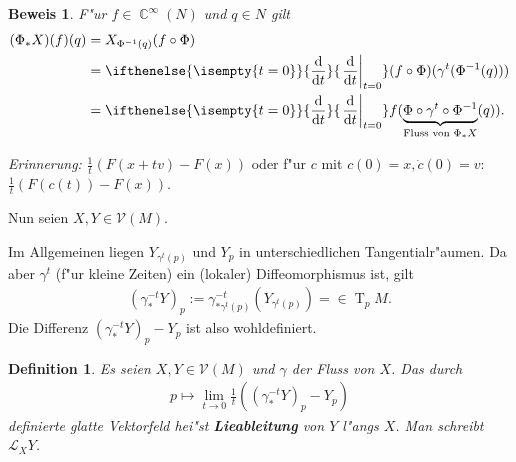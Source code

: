 \documentclass[paper=A4, twoside, chapterprefix=true, bibliography=totoc, headsepline]{scrbook}
\DeclareMathOperator{\C}{\mathbb{C}}
\DeclareMathOperator{\T}{T} %
\newcommand{\dop}{\mathrm{d}}
\newcommand{\difffrac}[3][]{\ifthenelse{\isempty{#1}}{\frac{\dop #2}{\dop #3}}{\left. \frac{\dop #2}{\dop #3} \right|_{#1}}}
\theoremstyle{plain}
\newtheorem{Dfn}{Definition}[chapter]
\newtheorem{Bem}[Dfn]{Bemerkung}
\theoremstyle{nonumberplain}
\newtheorem{bew}{Beweis}
\theoremstyle{empty}
\theoremstyle{break}
\newcommand{\CmIndex}[2][]{\ifthenelse{\isempty{#1}}{\index{#2}}{\index{#1}}#2}
\newcommand{\CmMark}[2][]{\textbf{\CmIndex[#1]{#2}}}
\begin{document}
\begin{bew}
F"ur $f \in \C^{\infty}(N)$ und $q \in N$ gilt
\begin{align*}
	(\Phi_{\ast}X)(f)(q) & = X_{\Phi^{-1}(q)}(f \circ \Phi)\\
	& = \difffrac[t=0]{}{t} (f \circ \Phi)(\gamma^t(\Phi^{-1}(q)))\\
	& = \difffrac[t=0]{}{t}f(\underbrace{\Phi \circ \gamma^t \circ \Phi^{-1}}_{\text{Fluss von }\Phi_{*}X}(q)).
\end{align*}
\end{bew}

\emph{Erinnerung:} $\frac{1}t(F(x+tv)-F(x))$ oder f"ur $c$ mit $c(0) = x, \dot c(0) = v$: $\frac{1}t(F(c(t))-F(x))$.

Nun seien $X,Y \in \mathcal V(M)$.
\begin{center}\end{center}

Im Allgemeinen liegen $Y_{\gamma^t(p)}$ und $Y_p$ in unterschiedlichen Tangentialr"aumen.
Da aber $\gamma^t$ (f"ur kleine Zeiten) ein (lokaler) Diffeomorphismus ist, gilt
\begin{align*}
  (\gamma_{*}^{-t}Y)_p := \gamma_{*\gamma^t(p)}^{-t}(Y_{\gamma^t(p)}) = \in \T_pM.
\end{align*}
Die Differenz $(\gamma_{*}^{-t}Y)_p - Y_p$ ist also wohldefiniert. 

\begin{Dfn}
  Es seien $X,Y \in \mathcal V(M)$ und $\gamma$ der Fluss von $X$.
Das durch 
\begin{align*}
  p \mapsto \lim_{t\to 0}\frac{1}t\left(\left(\gamma_{*}^{-t}Y\right)_p-Y_p\right)
\end{align*}
definierte glatte Vektorfeld hei"st \CmMark{Lieableitung} von $Y$ l"angs $X$. Man schreibt $\mathcal L_XY$.
\end{Dfn}
\end{document}
